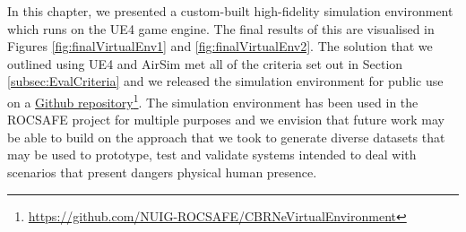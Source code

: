In this chapter, we presented a custom-built high-fidelity simulation environment which runs on the UE4 game engine. The final results of this are visualised in Figures \ref{fig:finalVirtualEnv1} and \ref{fig:finalVirtualEnv2}. The solution that we outlined using UE4 and AirSim met all of the criteria set out in Section \ref{subsec:EvalCriteria} and we released the simulation environment for public use on a \href{https://github.com/NUIG-ROCSAFE/CBRNeVirtualEnvironment}{Github repository}\footnote{\href{https://github.com/NUIG-ROCSAFE/CBRNeVirtualEnvironment}{https://github.com/NUIG-ROCSAFE/CBRNeVirtualEnvironment}}.
The simulation environment has been used in the ROCSAFE project for multiple purposes and we envision that future work may be able to build on the approach that we took to generate diverse datasets that may be used to prototype, test and validate systems intended to deal with scenarios that present dangers physical human presence.\par